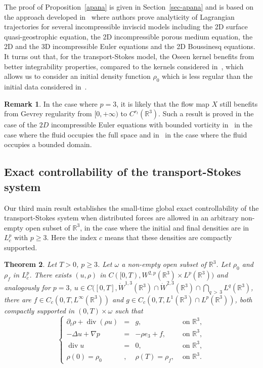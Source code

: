 \documentclass[10pt]{amsart}
\newtheorem{theo}{Theorem}[section]
\theoremstyle{definition}\newtheorem{defi}[theo]{Definition}\newtheorem{rema}[theo]{Remark}\newtheorem{exam}[theo]{Example}\newtheorem{exem}[theo]{Example}\newtheorem{nota}[theo]{Notation}
\newcommand{\R}{\mathbb{R}}
\renewcommand{\geq}{\geqslant}
\renewcommand{\div}{\operatorname{div}}
\begin{document}
The proof of Proposition~\ref{apana} is given in Section~\ref{sec-apana} and is based on the approach developed in~\cite{CVW} where authors prove analyticity of Lagrangian trajectories for several incompressible inviscid models including the 2D surface quasi-geostrophic equation, the 2D incompressible porous medium equation, the 2D and the 3D incompressible Euler equations and the 2D Boussinesq equations. It turns out that, for the transport-Stokes model, the Oseen kernel benefits from better integrability properties, compared to the kernels considered in~\cite{CVW}, which allows us to consider an initial density function $\rho_0$ which is less regular than the initial data considered in~\cite{CVW}.

\begin{rema}\label{G3}
In the case where $p=3$, it is likely that the flow map $X$ still benefits from Gevrey regularity from $[0,+\infty)$ to $C^{r_t}(\R^3)$. Such a result is proved in the case of the $2D$ incompressible Euler equations with bounded vorticity in~\cite{Gamblin} in the case where the fluid occupies the full space and in~\cite{Sueur} in the case where the fluid occupies a bounded domain.
\end{rema}



\subsection{Exact controllability of the transport-Stokes system}

Our third main result establishes the small-time global exact controllability of the transport-Stokes system when distributed forces are allowed in an arbitrary non-empty open subset of $\R^3$, in the case where the initial and final densities are in $L^p_c$ with $p \geq 3$. Here the index $c$ means that these densities are compactly supported.

\begin{theo}\label{TS-control}
Let $T>0$, $p\geq 3$. Let $\omega$ a non-empty open subset of $\R^3$. Let $\rho_0$ and $\rho_f$ in $L^p_c$. There exists $ (u,\rho)$ in $C([0,T),W^{2,p}(\R^3) \times L^p(\R^3))$ and analogously for $p=3$, $u \in C([0,T],\dot{W}^{1,3}(\R^3)\cap \dot{W}^{2,3}(\R^3) \cap \bigcap_{q\,>\,3} L^q(\R^3)$, there are $f \in C_c(0,T, L^\infty(\R^3))$ and $g \in C_c(0,T,L^1(\R^3)\cap L^p(\R^3)) $, both compactly supported in $(0,T)\times \omega $ such that
\begin{equation*}
\left \{
\begin{array}{rcll}
\partial_t \rho +\div(\rho u)&=& g,& \text{ on } \R^3,\\
-\Delta u+\nabla p &=& - \rho e_3+f,& \text{ on } \R^3,\\
\div u&=& 0,& \text{ on } \R^3,\\
\rho(0)=\rho_0&,& \rho(T)=\rho_f,& \text{ on } \R^3.
\end{array}
\right.
\end{equation*}
\end{theo}
\end{document}
